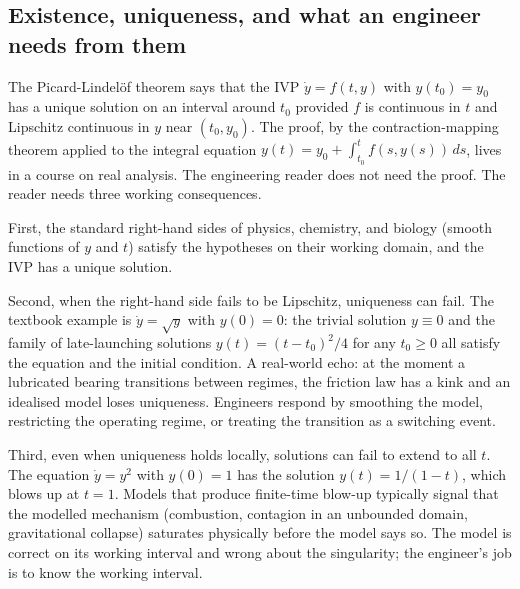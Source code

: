\subsection{Existence, uniqueness, and what an engineer needs from them}

The Picard-Lindel\"of theorem says that the IVP $\dot{y} = f(t, y)$
with $y(t_{0}) = y_{0}$ has a unique solution on an interval around
$t_{0}$ provided $f$ is continuous in $t$ and Lipschitz continuous
in $y$ near $(t_{0}, y_{0})$. The proof, by the contraction-mapping
theorem applied to the integral equation
$y(t) = y_{0} + \int_{t_{0}}^{t} f(s, y(s))\,ds$, lives in a course
on real analysis. The engineering reader does not need the proof.
The reader needs three working consequences.

First, the standard right-hand sides of physics, chemistry, and
biology (smooth functions of $y$ and $t$) satisfy the hypotheses on
their working domain, and the IVP has a unique solution.

Second, when the right-hand side fails to be Lipschitz, uniqueness
can fail. The textbook example is $\dot{y} = \sqrt{y}$ with $y(0) =
0$: the trivial solution $y \equiv 0$ and the family of
late-launching solutions $y(t) = (t - t_{0})^{2}/4$ for any $t_{0}
\geq 0$ all satisfy the equation and the initial condition. A
real-world echo: at the moment a lubricated bearing transitions
between regimes, the friction law has a kink and an idealised model
loses uniqueness. Engineers respond by smoothing the model,
restricting the operating regime, or treating the transition as a
switching event.

Third, even when uniqueness holds locally, solutions can fail to
extend to all $t$. The equation $\dot{y} = y^{2}$ with $y(0) = 1$
has the solution $y(t) = 1/(1 - t)$, which blows up at $t = 1$.
Models that produce finite-time blow-up typically signal that the
modelled mechanism (combustion, contagion in an unbounded domain,
gravitational collapse) saturates physically before the model says
so. The model is correct on its working interval and wrong about
the singularity; the engineer's job is to know the working
interval.


